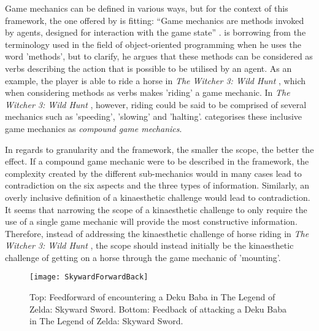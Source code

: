 Game mechanics can be defined in various ways, but for the context of this framework, the one offered by  is fitting: ``Game mechanics are methods invoked by agents, designed for interaction with the game state'' \cite{sicartmechanic}.  is borrowing from the terminology used in the field of object-oriented programming when he uses the word 'methods', but to clarify, he argues that these methods can be considered as verbs describing the action that is possible to be utilised by an agent. As an example, the player is able to ride a horse in \textit{The Witcher 3: Wild Hunt} \cite{witcher}, which when considering methods as verbs makes 'riding' a game mechanic. In \textit{The Witcher 3: Wild Hunt} \cite{witcher}, however, riding could be said to be comprised of several mechanics such as 'speeding', 'slowing' and 'halting'.  categorises these inclusive game mechanics as \textit{compound game mechanics}.

In regards to granularity and the framework, the smaller the scope, the better the effect. If a compound game mechanic were to be described in the framework, the complexity created by the different sub-mechanics would in many cases lead to contradiction on the six aspects and the three types of information. Similarly, an overly inclusive definition of a kinaesthetic challenge would lead to contradiction. It seems that narrowing the scope of a kinaesthetic challenge to only require the use of a single game mechanic will provide the most constructive information. Therefore, instead of addressing the kinaesthetic challenge of horse riding in \textit{The Witcher 3: Wild Hunt} \cite{witcher}, the scope should instead initially be the kinaesthetic challenge of getting on a horse through the game mechanic of 'mounting'.

\begin{figure}[h]
  \texttt{[image: SkywardForwardBack]}
  \caption{Top: Feedforward of encountering a Deku Baba in The Legend of Zelda: Skyward Sword. Bottom: Feedback of attacking a Deku Baba in The Legend of Zelda: Skyward Sword.}
  \label{SkywardForwardBack}
\end{figure}

